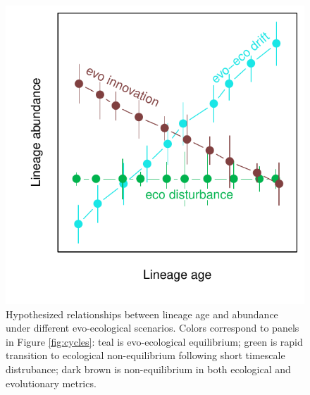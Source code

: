 \documentclass[12pt]{article}
\begin{document}
\begin{figure}[!htp]
  \centering
  \includegraphics[scale=1]{fig_age-abund.pdf}
  \caption{Hypothesized relationships between lineage age and
    abundance under different evo-ecological scenarios. Colors
    correspond to panels in Figure \ref{fig:cycles}: teal is
    evo-ecological equilibrium; green is rapid transition to
    ecological non-equilibrium following short timescale distrubance;
    dark brown is non-equilibrium in both ecological and evolutionary
    metrics.}
  \label{fig:age-abund}
\end{figure}

\pagebreak



\end{document}
